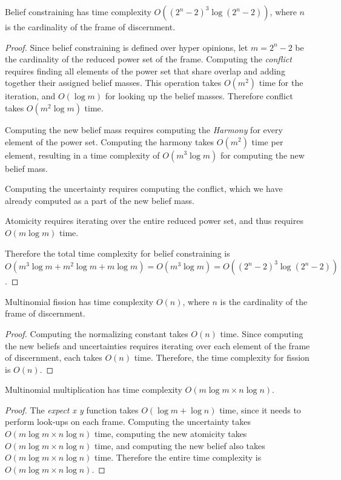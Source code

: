 \documentclass[thesis.tex]{subfiles}
\begin{document}
\begin{theorem}
  Belief constraining has time complexity $O ((2^n - 2)^3 \log (2^n - 2))$,
  where $n$ is the cardinality of the frame of discernment.
\end{theorem}

\begin{proof}
  Since belief constraining is defined over hyper opinions, let $m = 2^n - 2$ be the cardinality
  of the reduced power set of the frame. Computing the \emph{conflict} requires finding all elements of
  the power set that share overlap and adding together their assigned belief masses. This operation
  takes $O (m^2)$ time for the iteration, and $O (\log m)$ for looking up the belief masses. Therefore
  conflict takes $O (m^2 \log m)$ time.

  Computing the new belief mass requires computing the \emph{Harmony} for every element of the power set.
  Computing the harmony takes $O (m^2)$ time per element, resulting in a time complexity of $O (m^3 \log m)$
  for computing the new belief mass.

  Computing the uncertainty requires computing the conflict, which we have already computed as a part of
  the new belief mass.

  Atomicity requires iterating over the entire reduced power set, and thus requires $O (m \log m)$ time.

  Therefore the total time complexity for belief constraining is
  $O (m^3 \log m + m^2 \log m + m \log m) = O (m^3 \log m) = O ((2^n - 2)^3 \log (2^n - 2))$.
\end{proof}

\begin{theorem}
  Multinomial fission has time complexity $O (n)$, where $n$ is the cardinality of the frame of discernment.
\end{theorem}

\begin{proof}
  Computing the normalizing constant takes $O (n)$ time. Since computing the new beliefs and uncertainties
  requires iterating over each element of the frame of discernment, each takes $O (n)$ time. Therefore, the
  time complexity for fission is $O (n)$.
\end{proof}

\begin{theorem}
  Multinomial multiplication has time complexity $O (m \log m \times n \log n)$.
\end{theorem}

\begin{proof}
  The \emph{expect x y} function takes $O (\log m + \log n)$ time, since it needs to perform
  look-ups on each frame. Computing the uncertainty takes $O (m \log m \times n \log n)$ time,
  computing the new atomicity takes $O (m \log m \times n \log n)$ time, and computing the new
  belief also takes $O (m \log m \times n \log n)$ time. Therefore the entire time complexity is
  $O (m \log m \times n \log n)$.
\end{proof}
\end{document}
